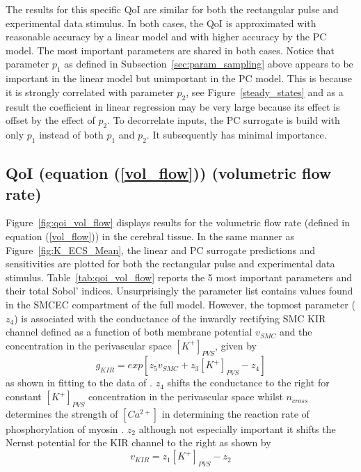 The results for this specific QoI are similar for both the rectangular pulse and experimental data stimulus. In both cases, the QoI is approximated with reasonable accuracy by a linear model and with higher accuracy by the PC model. The most important parameters are shared in both cases. Notice that parameter $p_1$ as defined in Subsection~\ref{sec:param_sampling} above appears to be important in the linear model but unimportant in the PC model. This is because it is strongly correlated with parameter $p_2$, see Figure~\ref{steady_states}  and as a result the coefficient in linear regression may be very large because its effect is offset by the effect of $p_2$. To decorrelate inputs, the PC surrogate is build with only $p_1$ instead of both $p_1$ and $p_2$. It subsequently has minimal importance.

\subsection{QoI (equation (\ref{vol_flow})) (volumetric flow rate)}

Figure~\ref{fig:qoi_vol_flow} displays results for the volumetric flow rate (defined in equation (\ref{vol_flow})) in the cerebral tissue. In the same manner as Figure~\ref{fig:K_ECS_Mean}, the linear and PC surrogate predictions and sensitivities are plotted for both the rectangular pulse and experimental data stimulus. Table~\ref{tab:qoi_vol_flow} reports the 5 most important parameters and their total Sobol' indices. Unsurprisingly the parameter list contains values found in the SMCEC compartment of the full model. However, the topmost parameter ($z_4$) is associated with the conductance of the inwardly rectifying SMC KIR channel defined as a function of both membrane potential $v_{SMC}$ and the \pot concentration in the perivascular space $[K^+]_{PVS}$, given by 
\begin{equation}
g_{KIR}=exp\left[ z_5 v_{SMC}+z_3[K^+]_{PVS}-z_4\right] 
\end{equation}
as shown in \cite{Dormanns2015} fitting to the data of \cite{Filosa2006}. $z_4$ shifts the conductance to the right for constant $[K^+]_{PVS}$  concentration in the perivascular space whilst $n_{cross}$ determines the strength of $[Ca^{2+}]$ in determining the reaction rate of phosphorylation of myosin \cite{Hai1988}. $z_2$ although not especially important it shifts the Nernst potential for the KIR channel to the right as shown by 
\begin{equation}
v_{KIR}=z_1 [K^+]_{PVS}-z_2
\end{equation}

